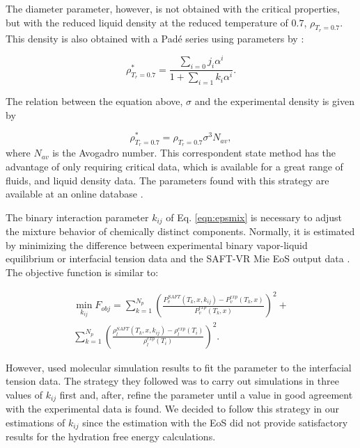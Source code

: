 The diameter parameter, however, is not obtained with the critical properties, but with the reduced liquid density at the reduced temperature of $0.7$, $\rho_{T_{r}=0.7}$. This density is also obtained with a Padé series using parameters by :

\begin{equation}
\rho_{T_{r}=0.7}^{*} = \frac{\sum_{i=0} j_{i}\alpha^{i}}{1+\sum_{i=1} k_{i}\alpha^{i}} .
\label{eqn:denscorre}
\end{equation}

The relation between the equation above, $\sigma$ and the experimental density is given by

\begin{equation}
\rho_{T_{r}=0.7}^{*} = \rho_{T_{r}=0.7}\sigma^{3}N_{av},   
\label{eqn:sigmacorre}
\end{equation}
where $N_{av}$ is the Avogadro number. This correspondent state method has the advantage of only requiring critical data, which is available for a great range of fluids, and liquid density data. The parameters found with this strategy are available at an online database \cite{ervik2016}.     

The binary interaction parameter $k_{ij}$ of Eq. \eqref{eqn:epsmix} is necessary to adjust the mixture behavior of chemically distinct components. Normally, it is estimated by minimizing the difference between experimental binary vapor-liquid equilibrium or interfacial tension data and the SAFT-VR Mie EoS output data \cite{muller2017,lobanova2016}. The objective function is similar to: 

\begin{equation}
\begin{aligned}
\min\limits_{k_{ij}} F_{obj}= \sum_{k=1}^{N_{p}} \left(\frac{P_{v}^{SAFT}(T_{k},x,k_{ij})-P_{v}^{exp}(T_{k},x)}{P_{v}^{exp}(T_{k},x)} \right)^2 +\\
\sum_{k=1}^{N_{p}} \left(\frac{\rho_{l}^{SAFT}(T_{k},x,k_{ij})-\rho_{l}^{exp}(T_{i})}{\rho_{l}^{exp}(T_{i})} \right)^2 .
\end{aligned}
\label{eqn:fobjmix}
\end{equation}

However,  used molecular simulation results to fit the parameter to the interfacial tension data. The strategy they followed was to carry out simulations in three values of $k_{ij}$ first and, after, refine the parameter until a value in good agreement with the experimental data is found. We decided to follow this strategy in our estimations of $k_{ij}$ since the estimation with the EoS did not provide satisfactory results for the hydration free energy calculations.  

